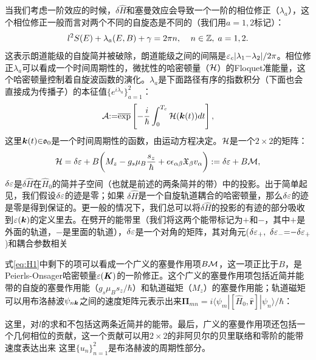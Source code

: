 当我们考虑一阶效应的时候，$\delta \hat{H}$和塞曼效应会导致一个一阶的相位修正（$\lambda_a$），这个相位修正一般而言对两个不同的自旋态是不同的（我们用$a{=}1,2$标记）：
\begin{equation}
l^2S(E)+\lambda_a(E,B)+\gamma=2\pi n,\;\;\;\;  n\in \mathbb{Z},\;a=1,2. \label{eq:rule}
\end{equation}
这表示朗道能级的自旋简并被破除，朗道能级之间的间隔是$\varepsilon_c|\lambda_1{-}\lambda_2|/2\pi$。相位修正$\lambda_a$可以看成一个时间周期性的，微扰性的哈密顿量（${\cal H}$）的Floquet准能量\cite{shirley_solution_1965}，这个哈密顿量控制着自旋波函数的演化。$\lambda_a$是下面路径有序的指数积分（下面也会直接成为传播子）的本征值$\{e^{i\lambda_a}\}_{a=1}^2$：
\begin{equation}
{\cal A}{:}{=}\overline{\exp}\left[-\frac{i}{\hbar}\int_0^{T_c} {\cal H}(\boldsymbol{k}(t)) dt\right],
\label{eq:prop}
\end{equation}
这里$\boldsymbol{k}(t){\in}\mathfrak{o}_0$是一个时间周期性的函数，由运动方程决定。${\cal H}$是一个$2\times 2$的矩阵：
\begin{equation}
{\cal H}=\delta \varepsilon +B\bigg(M_z -g_s\mu_{B}\frac{s_z}{\hbar} + e\epsilon_{\alpha\beta}\mathfrak{X}_{\beta}v_{\alpha}\bigg):=\delta \varepsilon+B{\cal M},\label{eq:H1}
\end{equation}
$\delta \varepsilon$是$\delta \hat{H}$在$\hat{H}_0$的简并子空间（也就是前述的两条简并的带）中的投影。出于简单起见，我们假设$\delta \varepsilon$的迹是零；如果 $\delta\hat{H}$是一个自旋轨道耦合的哈密顿量，那么$\delta \varepsilon$的迹是零是得到保证的。更一般的情况下，我们总可以将$\delta \hat{H}$的投影的有迹的部分吸收到$\varepsilon(\boldsymbol{k})$的定义里去。在劈开的能带里（我们将这两个能带标记为${+}$和$-$，其中$+$是外面的轨道，$-$是里面的轨道），$\delta \varepsilon$是一个对角的矩阵，其对角元($\delta \varepsilon_+,~\delta \varepsilon_-{=}{-}\delta \varepsilon_+$)和耦合参数相关

式\ref{eq:H1}中剩下的项可以看成一个广义的塞曼作用项$B{\cal M}$，这一项正比于$B$，是Peierls-Onsager哈密顿量$\varepsilon(\boldsymbol{K})$的一阶修正\cite{rotheffham,blount_effham,kohn_effham}。这个广义的塞曼作用项包括近简并能带的自旋的塞曼作用能（$g_s\mu_Bs_z/\hbar$）和轨道磁矩（$M_z$）的塞曼作用能\cite{thonhauser_orbital_2005}；轨道磁矩可以用布洛赫波$\psi_{n\boldsymbol{k}}$之间的速度矩阵元表示出来$\boldsymbol{\Pi}_{mn}=i\langle\psi_m|[\hat{H}_0, \hat{\boldsymbol{r}}]|\psi_n\rangle/\hbar$：

这里，对$l$的求和不包括这两条近简并的能带。最后，广义的塞曼作用项还包括一个几何相位的贡献，这一个贡献可以用$2\times 2$的非阿贝尔的贝里联络\cite{berry_quantal_1984,wilczek_appearance_1984}和零阶的能带速度表达出来
这里$\{u_n\}_{n=1}^2$是布洛赫波的周期性部分。

